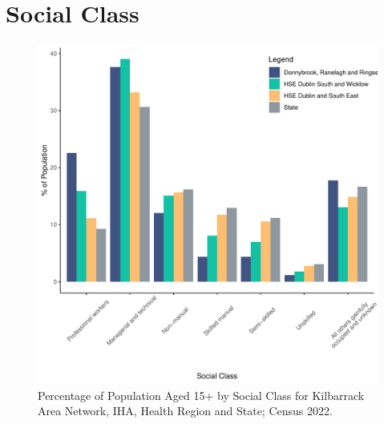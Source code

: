 \documentclass{article}
\begin{document}
\section{Social Class}\label{sect:SC}
\begin{figure}[H]
	\centering
	\includegraphics[width = 140mm]{../figures/SocialClassED.pdf}
	\caption{Percentage of Population Aged 15+ by Social Class for Kilbarrack Area Network, IHA, Health Region and State; Census 2022.}
	\label{fig:vbnv}
	\end{figure}
\end{document}
